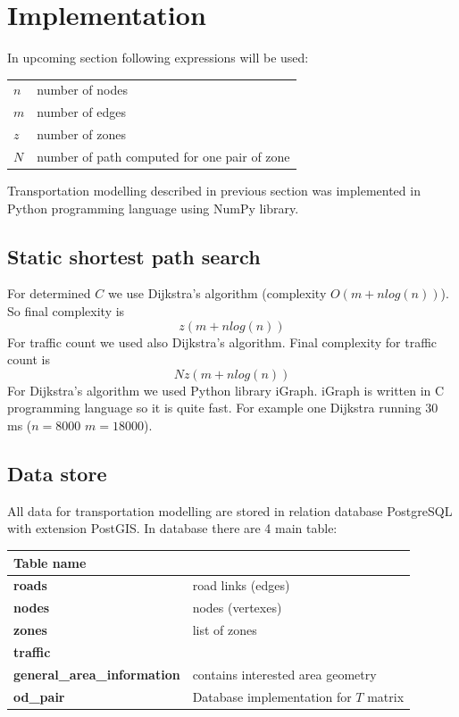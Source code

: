 \section{Implementation}
In upcoming section following expressions will be used:

\begin{tabular}{ll}
$n$ & number of nodes\\
$m$ & number of edges \\
$z$ & number of zones\\
$N$ & number of path computed for one pair of zone
\end{tabular}

Transportation modelling described in previous section was implemented in Python programming language using NumPy library.

\subsection{Static shortest path search}
For determined $C$ we use Dijkstra's algorithm (complexity $O(m +n log(n) )$). So final complexity is 
$$z (m + n log(n))$$
For traffic count we used also Dijkstra's algorithm. Final complexity for traffic count is 
$$N z (m + n log(n))$$
For Dijkstra's algorithm we used Python library iGraph. iGraph is written in C programming language so it is quite fast. For example one Dijkstra running 30 ms ($n = 8000$ $m = 18000$).

\subsection{Data store}
All data for transportation modelling are stored in relation database PostgreSQL with extension PostGIS. In database there are 4 main table:

\begin{tabular}{|l|l|}
\hline
Table name & \\
\hline
\hline
\textbf{roads} & road links (edges)\\
\textbf{nodes} & nodes (vertexes)\\
\textbf{zones} & list of zones\\ 
\textbf{traffic} & \\
\textbf{general\_area\_information} & contains interested area geometry\\
\textbf{od\_pair} & Database implementation for $T$ matrix\\
\end{tabular}

